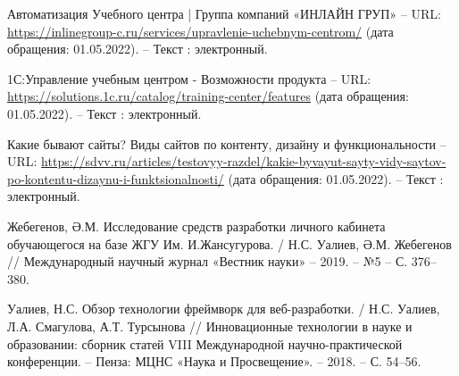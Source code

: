 \begingroup
\renewcommand{\section}[2]{\anonsection{Список использованных источников}}
\begin{thebibliography}{00}


        Автоматизация Учебного центра | Группа компаний «ИНЛАЙН ГРУП»
        --
        URL:
        \href{https://inlinegroup-c.ru/services/upravlenie-uchebnym-centrom/}{https://inlinegroup-c.ru/services/upravlenie-uchebnym-centrom/}
        (дата обращения: 01.05.2022).
        --
        Текст : электронный.

        1С:Управление учебным центром - Возможности продукта
        --
        URL:
        \href{https://solutions.1c.ru/catalog/training-center/features}{https://solutions.1c.ru/catalog/training-center/features}
        (дата обращения: 01.05.2022).
        --
        Текст : электронный.

		Какие бывают сайты? Виды сайтов по контенту, дизайну и функциональности
        --
        URL:
        \href{https://sdvv.ru/articles/testovyy-razdel/kakie-byvayut-sayty-vidy-saytov-po-kontentu-dizaynu-i-funktsionalnosti/}{https://sdvv.ru/articles/testovyy-razdel/kakie-byvayut-sayty-vidy-saytov-po-kontentu-dizaynu-i-funktsionalnosti/}
        (дата обращения: 01.05.2022).
        --
        Текст : электронный.
    

        Жебегенов, Ә.М. Исследование средств разработки личного кабинета обучающегося на базе ЖГУ Им. И.Жансугурова.
        /
        Н.С. Уалиев, Ә.М. Жебегенов
        //
        Международный научный журнал «Вестник науки»
        --
        2019.
        --
        №5
        --
        С. 376--380.

        Уалиев, Н.С. Обзор технологии фреймворк для веб-разработки.
        /
        Н.С. Уалиев, Л.А. Смагулова, А.Т. Турсынова
        //
        Инновационные технологии в науке и образовании: сборник статей VIII Международной научно-практической конференции.
        --
        Пенза: МЦНС «Наука и Просвещение».
        --
        2018.
        --
        С. 54--56.


\end{thebibliography}
